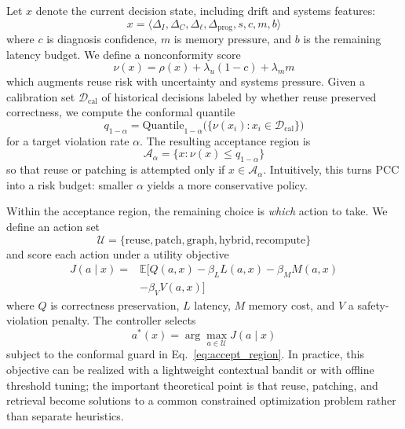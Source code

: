 \documentclass[11pt,a4paper,twocolumn]{article}
\begin{document}
Let $x$ denote the current decision state, including drift and systems features:
\begin{equation}
\label{eq:decision_state}
x = \langle \Delta_I, \Delta_C, \Delta_\ell, \Delta_{\text{prog}}, s, c, m, b \rangle
\end{equation}
where $c$ is diagnosis confidence, $m$ is memory pressure, and $b$ is the remaining latency budget. We define a nonconformity score
\begin{equation}
\label{eq:nonconformity}
\nu(x) = \rho(x) + \lambda_u (1-c) + \lambda_m m
\end{equation}
which augments reuse risk with uncertainty and systems pressure. Given a calibration set $\mathcal{D}_{\text{cal}}$ of historical decisions labeled by whether reuse preserved correctness, we compute the conformal quantile
\begin{equation}
\label{eq:conformal_quantile}
q_{1-\alpha} = \text{Quantile}_{1-\alpha}\big(\{\nu(x_i) : x_i \in \mathcal{D}_{\text{cal}}\}\big)
\end{equation}
for a target violation rate $\alpha$. The resulting acceptance region is
\begin{equation}
\label{eq:accept_region}
\mathcal{A}_{\alpha} = \{x : \nu(x) \leq q_{1-\alpha}\}
\end{equation}
so that reuse or patching is attempted only if $x \in \mathcal{A}_{\alpha}$. Intuitively, this turns PCC into a risk budget: smaller $\alpha$ yields a more conservative policy.

Within the acceptance region, the remaining choice is \emph{which} action to take. We define an action set
\begin{equation}
\label{eq:action_set}
\mathcal{U} = \{\text{reuse},\text{patch},\text{graph},\text{hybrid},\text{recompute}\}
\end{equation}
and score each action under a utility objective
\begin{equation}
\label{eq:utility_objective}
\begin{aligned}
J(a \mid x) ={}& \mathbb{E}\big[Q(a, x) - \beta_L L(a, x) - \beta_M M(a, x) \\
& - \beta_V V(a, x)\big]
\end{aligned}
\end{equation}
where $Q$ is correctness preservation, $L$ latency, $M$ memory cost, and $V$ a safety-violation penalty. The controller selects
\begin{equation}
\label{eq:action_argmax}
a^*(x) = \arg\max_{a \in \mathcal{U}} J(a \mid x)
\end{equation}
subject to the conformal guard in Eq.~\ref{eq:accept_region}. In practice, this objective can be realized with a lightweight contextual bandit or with offline threshold tuning; the important theoretical point is that reuse, patching, and retrieval become solutions to a common constrained optimization problem rather than separate heuristics.
\end{document}
